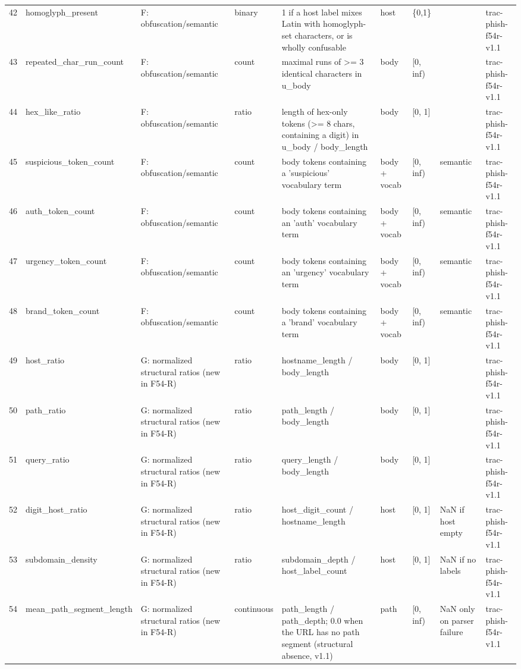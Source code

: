 \begin{tabular}{rllllllll}
42 & homoglyph\_present & F: obfuscation/semantic & binary & 1 if a host label mixes Latin with homoglyph-set characters, or is wholly confusable & host & \{0,1\} &  & trac-phish-f54r-v1.1 \\
43 & repeated\_char\_run\_count & F: obfuscation/semantic & count & maximal runs of >= 3 identical characters in u\_body & body & [0, inf) &  & trac-phish-f54r-v1.1 \\
44 & hex\_like\_ratio & F: obfuscation/semantic & ratio & length of hex-only tokens (>= 8 chars, containing a digit) in u\_body / body\_length & body & [0, 1] &  & trac-phish-f54r-v1.1 \\
45 & suspicious\_token\_count & F: obfuscation/semantic & count & body tokens containing a 'suspicious' vocabulary term & body + vocab & [0, inf) & semantic & trac-phish-f54r-v1.1 \\
46 & auth\_token\_count & F: obfuscation/semantic & count & body tokens containing an 'auth' vocabulary term & body + vocab & [0, inf) & semantic & trac-phish-f54r-v1.1 \\
47 & urgency\_token\_count & F: obfuscation/semantic & count & body tokens containing an 'urgency' vocabulary term & body + vocab & [0, inf) & semantic & trac-phish-f54r-v1.1 \\
48 & brand\_token\_count & F: obfuscation/semantic & count & body tokens containing a 'brand' vocabulary term & body + vocab & [0, inf) & semantic & trac-phish-f54r-v1.1 \\
49 & host\_ratio & G: normalized structural ratios (new in F54-R) & ratio & hostname\_length / body\_length & body & [0, 1] &  & trac-phish-f54r-v1.1 \\
50 & path\_ratio & G: normalized structural ratios (new in F54-R) & ratio & path\_length / body\_length & body & [0, 1] &  & trac-phish-f54r-v1.1 \\
51 & query\_ratio & G: normalized structural ratios (new in F54-R) & ratio & query\_length / body\_length & body & [0, 1] &  & trac-phish-f54r-v1.1 \\
52 & digit\_host\_ratio & G: normalized structural ratios (new in F54-R) & ratio & host\_digit\_count / hostname\_length & host & [0, 1] & NaN if host empty & trac-phish-f54r-v1.1 \\
53 & subdomain\_density & G: normalized structural ratios (new in F54-R) & ratio & subdomain\_depth / host\_label\_count & host & [0, 1] & NaN if no labels & trac-phish-f54r-v1.1 \\
54 & mean\_path\_segment\_length & G: normalized structural ratios (new in F54-R) & continuous & path\_length / path\_depth; 0.0 when the URL has no path segment (structural absence, v1.1) & path & [0, inf) & NaN only on parser failure & trac-phish-f54r-v1.1 \\
\bottomrule
\end{tabular}
